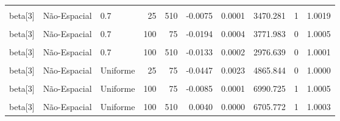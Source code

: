 \documentclass[
]{article}
\begin{document}
\begin{longtable}[t]{lllrrrrrrr}
\cmidrule{1-10}\pagebreak[0]
\cellcolor{gray!10}{beta[3]} & \cellcolor{gray!10}{Espacial} & \cellcolor{gray!10}{0.7} & \cellcolor{gray!10}{25} & \cellcolor{gray!10}{510} & \cellcolor{gray!10}{-0.0080} & \cellcolor{gray!10}{0.0001} & \cellcolor{gray!10}{3750.602} & \cellcolor{gray!10}{1} & \cellcolor{gray!10}{1.0001}\\
\cmidrule{1-10}\pagebreak[0]
beta[3] & Não-Espacial & 0.7 & 25 & 510 & -0.0075 & 0.0001 & 3470.281 & 1 & 1.0019\\
\cmidrule{1-10}\pagebreak[0]
\cellcolor{gray!10}{beta[3]} & \cellcolor{gray!10}{Espacial} & \cellcolor{gray!10}{0.7} & \cellcolor{gray!10}{100} & \cellcolor{gray!10}{75} & \cellcolor{gray!10}{-0.0192} & \cellcolor{gray!10}{0.0004} & \cellcolor{gray!10}{3793.292} & \cellcolor{gray!10}{0} & \cellcolor{gray!10}{1.0018}\\
\cmidrule{1-10}\pagebreak[0]
beta[3] & Não-Espacial & 0.7 & 100 & 75 & -0.0194 & 0.0004 & 3771.983 & 0 & 1.0005\\
\cmidrule{1-10}\pagebreak[0]
\cellcolor{gray!10}{beta[3]} & \cellcolor{gray!10}{Espacial} & \cellcolor{gray!10}{0.7} & \cellcolor{gray!10}{100} & \cellcolor{gray!10}{510} & \cellcolor{gray!10}{-0.0133} & \cellcolor{gray!10}{0.0002} & \cellcolor{gray!10}{2698.249} & \cellcolor{gray!10}{0} & \cellcolor{gray!10}{1.0000}\\
\cmidrule{1-10}\pagebreak[0]
beta[3] & Não-Espacial & 0.7 & 100 & 510 & -0.0133 & 0.0002 & 2976.639 & 0 & 1.0001\\
\cmidrule{1-10}\pagebreak[0]
\cellcolor{gray!10}{beta[3]} & \cellcolor{gray!10}{Espacial} & \cellcolor{gray!10}{Uniforme} & \cellcolor{gray!10}{25} & \cellcolor{gray!10}{75} & \cellcolor{gray!10}{-0.0449} & \cellcolor{gray!10}{0.0023} & \cellcolor{gray!10}{4209.713} & \cellcolor{gray!10}{0} & \cellcolor{gray!10}{1.0000}\\
\cmidrule{1-10}\pagebreak[0]
beta[3] & Não-Espacial & Uniforme & 25 & 75 & -0.0447 & 0.0023 & 4865.844 & 0 & 1.0000\\
\cmidrule{1-10}\pagebreak[0]
\cellcolor{gray!10}{beta[3]} & \cellcolor{gray!10}{Espacial} & \cellcolor{gray!10}{Uniforme} & \cellcolor{gray!10}{100} & \cellcolor{gray!10}{75} & \cellcolor{gray!10}{-0.0087} & \cellcolor{gray!10}{0.0001} & \cellcolor{gray!10}{6605.322} & \cellcolor{gray!10}{1} & \cellcolor{gray!10}{1.0004}\\
\cmidrule{1-10}\pagebreak[0]
beta[3] & Não-Espacial & Uniforme & 100 & 75 & -0.0085 & 0.0001 & 6990.725 & 1 & 1.0005\\
\cmidrule{1-10}\pagebreak[0]
\cellcolor{gray!10}{beta[3]} & \cellcolor{gray!10}{Espacial} & \cellcolor{gray!10}{Uniforme} & \cellcolor{gray!10}{100} & \cellcolor{gray!10}{510} & \cellcolor{gray!10}{0.0040} & \cellcolor{gray!10}{0.0000} & \cellcolor{gray!10}{6582.913} & \cellcolor{gray!10}{1} & \cellcolor{gray!10}{1.0005}\\
\cmidrule{1-10}\pagebreak[0]
beta[3] & Não-Espacial & Uniforme & 100 & 510 & 0.0040 & 0.0000 & 6705.772 & 1 & 1.0003\\
\bottomrule
\end{longtable}
\endgroup{}
\end{document}
